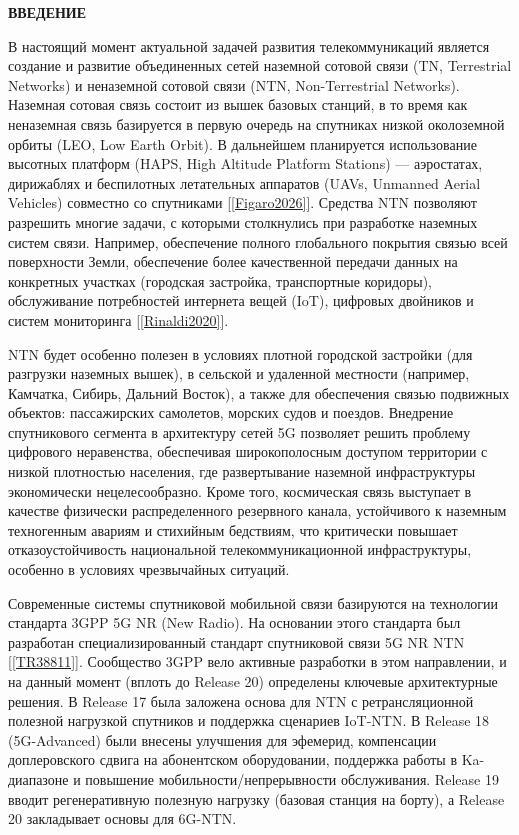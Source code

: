 \newpage
\begin{center}
  \textbf{\large ВВЕДЕНИЕ}
\end{center}

В настоящий момент актуальной задачей развития телекоммуникаций является создание и развитие объединенных сетей
наземной сотовой связи (TN, Terrestrial Networks) и неназемной сотовой связи (NTN, Non-Terrestrial Networks).
Наземная сотовая связь состоит из вышек базовых станций, в то время как неназемная связь базируется в первую очередь
на спутниках низкой околоземной орбиты (LEO, Low Earth Orbit). В дальнейшем планируется использование высотных платформ (HAPS, High Altitude Platform Stations)
— аэростатах, дирижаблях и беспилотных летательных аппаратов (UAVs, Unmanned Aerial Vehicles) совместно со спутниками [\ref{Figaro2026}].
Средства NTN позволяют разрешить многие задачи, с которыми столкнулись при разработке наземных систем связи.
Например, обеспечение полного глобального покрытия связью всей поверхности Земли,
обеспечение более качественной передачи данных на конкретных участках (городская застройка, транспортные коридоры),
обслуживание потребностей интернета вещей (IoT), цифровых двойников и систем мониторинга [\ref{Rinaldi2020}].

NTN будет особенно полезен в условиях плотной городской застройки (для разгрузки наземных вышек),
в сельской и удаленной местности (например, Камчатка, Сибирь, Дальний Восток),
а также для обеспечения связью подвижных объектов: пассажирских самолетов, морских судов и поездов.
Внедрение спутникового сегмента в архитектуру сетей 5G позволяет решить проблему цифрового неравенства,
обеспечивая широкополосным доступом территории с низкой плотностью населения,
где развертывание наземной инфраструктуры экономически нецелесообраз\-но. 
Кроме того, космическая связь выступает в качестве физически распределенного резервного канала, 
устойчивого к наземным техногенным авариям и стихийным бедствиям, что критически повышает отказоустойчи\-вость 
национальной телекоммуникационной инфраструктуры, особенно в условиях чрезвычайных ситуаций.

Современные системы спутниковой мобильной связи базируются на технологии стандарта 3GPP 5G NR (New Radio).
На основании этого стандарта был разработан специализированный стандарт спутниковой связи 5G NR NTN [\ref{TR38811}].
Сообщество 3GPP вело активные разработки в этом направлении, и на данный момент (вплоть до Release 20)
определены ключевые архитектурные решения. В Release 17 была заложена основа для NTN 
с ретрансляционной полезной нагрузкой спутников и поддержка сценариев IoT-NTN.
В Release 18 (5G-Advanced) были внесены улучшения для эфемерид, компенсации доплеровского сдвига на абонентском оборудовании,
поддержка работы в Ka-диапазоне и повышение мобильности/непрерывности обслуживания.
Release 19 вводит регенеративную полезную нагрузку (базовая станция на борту), а
Release 20 закладывает основы для 6G-NTN.

